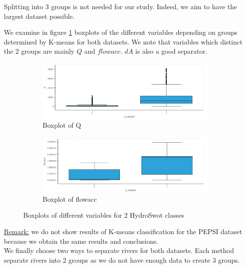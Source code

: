 Splitting into 3 groups is not needed for our study. Indeed, we aim to have the largest dataset possible. 

We examine in figure \ref{fig:boxplot_hydro} boxplots of the different variables depending on groups determined by K-means for both datasets. We note that variables which distinct the 2 groups are mainly $Q$ and $flowacc$. $dA$ is also a good separator. \newline

\begin{figure}[H]
\begin{subfigure}{0.45\textwidth }
     \centering
        \includegraphics[scale = 0.19]{Graph/bokeh_plot.png}
        \caption{Boxplot of Q}
\end{subfigure}
\begin{subfigure}{0.45\textwidth}
     \centering
        \includegraphics[scale = 0.19]{Graph/flowacc_hydro.png}
        \caption{Boxplot of flowacc }
\end{subfigure}
  \caption{Boxplots of different variables for 2 HydroSwot classes}     
  \label{fig:boxplot_hydro}
\end{figure}

\underline{Remark:} we do not show results of K-means classification for the PEPSI dataset because we obtain the same results and conclusions. \\
    
We finally choose two ways to separate rivers for both datasets. Each method separate rivers into 2 groups as we do not have enough data to create 3 groups.

